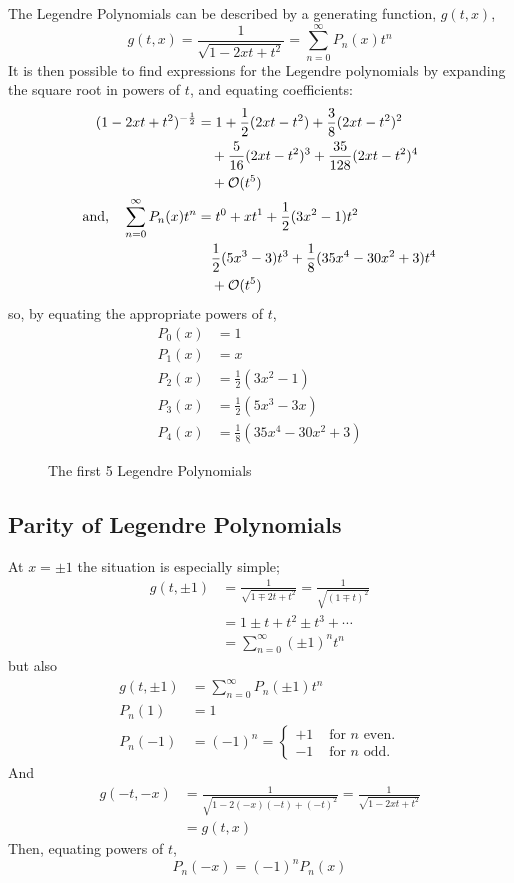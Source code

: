The Legendre Polynomials can be described by a generating function,
$g(t,x)$,
\begin{equation}
  \label{eq:legendregen}
  g(t,x) = \frac{1}{\sqrt{1- 2xt +t^2}} = \sum^{\infty}_{n=0} P_n(x) t^n
\end{equation}
It is then possible to find expressions for the Legendre polynomials
by expanding the square root in powers of $t$, and equating
coefficients:
\begin{align*}
  (1-2xt+t^2)^{-\frac{1}{2}} &= 1 + \frac{1}{2}(2xt -t^2)+\frac{3}{8}(2xt-t^2)^2\\&\quad +\frac{5}{16}(2xt-t^2)^3 + \frac{35}{128}(2xt-t^2)^4 \\ &\quad + {\cal O}(t^5)\\
  \text{and,}\quad \sum^{\infty}_{n=0} P_n(x) t^n &= t^0 + xt^1 +
  \frac{1}{2}(3x^2-1)t^2 \\&\quad \frac{1}{2}(5 x^3-3)t^3 +
  \frac{1}{8}(35x^4-30x^2+3)t^4 \\&\quad + {\cal O}(t^5)
\end{align*}
so, by equating the appropriate powers of $t$,
\begin{align*}
  P_0(x) &= 1 \\
  P_1(x) &= x \\
  P_2(x) &= \frac{1}{2}(3 x^2 - 1) \\
  P_3(x) &= \frac{1}{2}(5 x^3 - 3x) \\
  P_4(x) &= \frac{1}{8}(35 x^4 - 30x^2 + 3)
\end{align*}
\begin{figure}
  \centering 
  \caption{The first 5 Legendre Polynomials}
  \label{fig:legendrepoly}
\end{figure}

\subsection{Parity of Legendre Polynomials}
\label{sec:parity}

At $x = \pm 1$ the situation is especially simple;
\begin{align*}
  g(t, \pm 1) &= \frac{1}{\sqrt{1 \mp 2t + t^2}} = \frac{1}{\sqrt{(1 \mp t)^2}} \\
  &= 1 \pm t +t^2 \pm t^3 + \cdots \\
  &= \sum_{n=0}^{\infty} (\pm 1)^n t^n
\end{align*}
but also
\begin{align*}
  g(t, \pm 1) &= \sum^{\infty}_{n=0} P_n(\pm 1) t^n \\
  P_n(1) &=1 \\
  P_n(-1)&=(-1)^n =
  \begin{cases}
    +1 & \text{ for } n \text{ even.} \\
    -1 & \text{ for } n \text{ odd.}
  \end{cases}
\end{align*}
And
\begin{align*}
  g(-t,-x) &= \frac{1}{\sqrt{1-2(-x)(-t)+(-t)^2}} = \frac{1}{\sqrt{1-2xt+t^2}} \\
  &= g(t,x)
\end{align*}
Then, equating powers of $t$,
\[ P_n(-x) = (-1)^nP_n(x) \]

